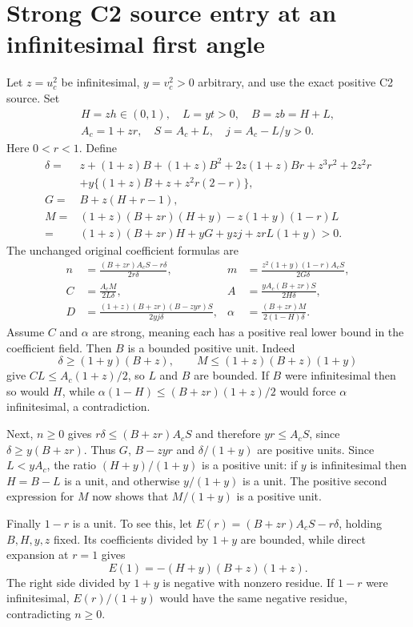 \section{Strong C2 source entry at an infinitesimal first angle}
\label{sec:strong-angle-entry}
Let $z=u_c^2$ be infinitesimal, $y=v_c^2>0$ arbitrary, and use the exact
positive C2 source. Set
\[
 \begin{gathered}
 H=zh\in(0,1),\quad L=yt>0,\quad B=zb=H+L,\\
 A_c=1+zr,\quad S=A_c+L,\quad j=A_c-L/y>0.
 \end{gathered}
\]
Here $0<r<1$. Define
\begin{align*}
 \delta={}&z+(1+z)B+(1+z)B^2+2z(1+z)Br+z^3r^2+2z^2r\\
 &+y\{(1+z)B+z+z^2r(2-r)\},\\
 G={}&B+z(H+r-1),\\
 M={}&(1+z)(B+zr)(H+y)-z(1+y)(1-r)L\\
 ={}&(1+z)(B+zr)H+yG+yzj+zrL(1+y)>0.
\end{align*}
The unchanged original coefficient formulas are
\begin{align*}
 n&=\frac{(B+zr)A_cS-r\delta}{2r\delta},&
 m&=\frac{z^2(1+y)(1-r)A_cS}{2G\delta},\\
 C&=\frac{A_cM}{2L\delta},&
 A&=\frac{yA_c(B+zr)S}{2H\delta},\\
 D&=\frac{(1+z)(B+zr)(B-zyr)S}{2yj\delta},&
 \alpha&=\frac{(B+zr)M}{2(1-H)\delta}.
\tag{GE1}
\end{align*}
Assume $C$ and $\alpha$ are strong, meaning each has a positive real
lower bound in the coefficient field. Then $B$ is a bounded positive
unit. Indeed
\[
 \delta\ge(1+y)(B+z),\qquad
 M\le(1+z)(B+z)(1+y)
\]
give $CL\le A_c(1+z)/2$, so $L$ and $B$ are bounded.
If $B$ were infinitesimal then so would $H$, while
$\alpha(1-H)\le(B+zr)(1+z)/2$ would force $\alpha$ infinitesimal,
a contradiction.

Next, $n\ge0$ gives $r\delta\le(B+zr)A_cS$ and therefore
$yr\le A_cS$, since $\delta\ge y(B+zr)$.
Thus $G$, $B-zyr$ and $\delta/(1+y)$ are positive units.
Since $L<yA_c$, the ratio $(H+y)/(1+y)$ is a positive unit: if $y$
is infinitesimal then $H=B-L$ is a unit, and otherwise $y/(1+y)$
is a unit. The positive second expression for $M$ now shows that
$M/(1+y)$ is a positive unit.

Finally $1-r$ is a unit. To see this, let
$E(r)=(B+zr)A_cS-r\delta$, holding $B,H,y,z$ fixed.
Its coefficients divided by $1+y$ are bounded, while direct expansion
at $r=1$ gives
\[
 E(1)=-(H+y)(B+z)(1+z).
\]
The right side divided by $1+y$ is negative with nonzero residue.
If $1-r$ were infinitesimal, $E(r)/(1+y)$ would have the same negative
residue, contradicting $n\ge0$.


